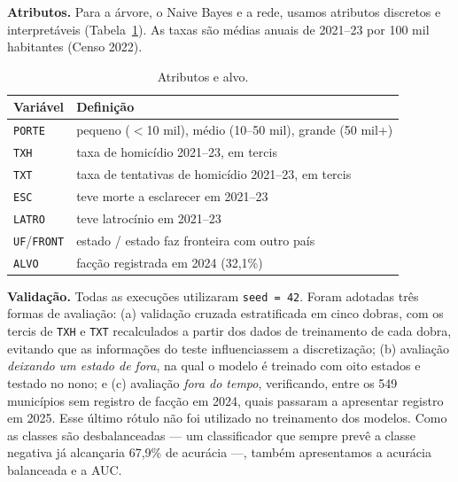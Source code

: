 \documentclass[10pt,a4paper,twocolumn]{article}
\begin{document}
\textbf{Atributos.} Para a árvore, o Naive Bayes e a rede, usamos atributos discretos e
interpretáveis (Tabela~\ref{tab:atrib}). As taxas são médias anuais de 2021--23 por 100 mil
habitantes (Censo 2022).

\begin{table}[H]\centering\small
\begin{tabular}{lp{5.6cm}}\toprule
Variável & Definição\\\midrule
\texttt{PORTE} & pequeno ($<$10 mil), médio (10--50 mil), grande (50 mil+)\\
\texttt{TXH} & taxa de homicídio 2021--23, em tercis\\
\texttt{TXT} & taxa de tentativas de homicídio 2021--23, em tercis\\
\texttt{ESC} & teve morte a esclarecer em 2021--23\\
\texttt{LATRO} & teve latrocínio em 2021--23\\
\texttt{UF}/\texttt{FRONT} & estado / estado faz fronteira com outro país\\
\texttt{ALVO} & facção registrada em 2024 (32,1\%)\\\bottomrule
\end{tabular}\caption{Atributos e alvo.}\label{tab:atrib}\end{table}

\textbf{Validação.} Todas as execuções utilizaram \texttt{seed = 42}. Foram adotadas três formas de avaliação: (a) validação cruzada estratificada em cinco dobras, com os tercis de \texttt{TXH} e \texttt{TXT} recalculados a partir dos dados de treinamento de cada dobra, evitando que as informações do teste influenciassem a discretização; (b) avaliação \emph{deixando um estado de fora}, na qual o modelo é treinado com oito estados e testado no nono; e (c) avaliação \emph{fora do tempo}, verificando, entre os 549 municípios sem registro de facção em 2024, quais passaram a apresentar registro em 2025. Esse último rótulo não foi utilizado no treinamento dos modelos. Como as classes são desbalanceadas — um classificador que sempre prevê a classe negativa já alcançaria 67,9\% de acurácia —, também apresentamos a acurácia balanceada e a AUC.
\end{document}
